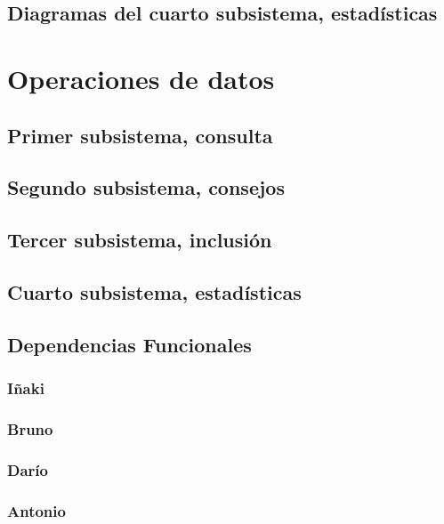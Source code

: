 \documentclass[a4paper, 11pt]{article}
\begin{document}



\newpage


\subsection{Diagramas del cuarto subsistema, estadísticas}


\newpage
\section{Operaciones de datos}

\subsection{Primer subsistema, consulta}


\subsection{Segundo subsistema, consejos}


\subsection{ Tercer subsistema, inclusión}


\subsection{Cuarto subsistema, estadísticas}




\newpage
\subsection{Dependencias Funcionales}
\begin{itemize}
	\subsubsection{Iñaki}

\subsubsection{Bruno}

\subsubsection{Darío}

\subsubsection{Antonio}

\end{itemize}
\end{document}

